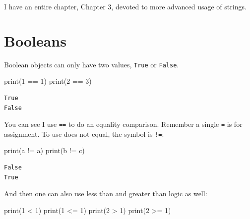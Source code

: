 \documentclass[
  letterpaper,
]{scrbook}
\newenvironment{Shaded}{\begin{snugshade}}{\end{snugshade}}
\newcommand{\BuiltInTok}[1]{\textcolor[rgb]{0.00,0.23,0.31}{#1}}
\newcommand{\DecValTok}[1]{\textcolor[rgb]{0.68,0.00,0.00}{#1}}
\newcommand{\NormalTok}[1]{\textcolor[rgb]{0.00,0.23,0.31}{#1}}
\newcommand{\OperatorTok}[1]{\textcolor[rgb]{0.37,0.37,0.37}{#1}}
\newcommand{\StringTok}[1]{\textcolor[rgb]{0.13,0.47,0.30}{#1}}
\begin{document}
I have an entire chapter, Chapter 3, devoted to more advanced usage of
strings.

\section{Booleans}\label{sec-bool}

Boolean objects can only have two values, \texttt{True} or
\texttt{False}.

\begin{Shaded}
\begin{Highlighting}[]
\BuiltInTok{print}\NormalTok{(}\DecValTok{1} \OperatorTok{==} \DecValTok{1}\NormalTok{)}
\BuiltInTok{print}\NormalTok{(}\DecValTok{2} \OperatorTok{==} \DecValTok{3}\NormalTok{)}
\end{Highlighting}
\end{Shaded}

\begin{verbatim}
True
False
\end{verbatim}

You can see I use \texttt{==} to do an equality comparison. Remember a
single \texttt{=} is for assignment. To use does not equal, the symbol
is \texttt{!=}:

\begin{Shaded}
\begin{Highlighting}[]
\BuiltInTok{print}\NormalTok{(}\StringTok{\textquotesingle{}a\textquotesingle{}} \OperatorTok{!=} \StringTok{\textquotesingle{}a\textquotesingle{}}\NormalTok{)}
\BuiltInTok{print}\NormalTok{(}\StringTok{\textquotesingle{}b\textquotesingle{}} \OperatorTok{!=} \StringTok{\textquotesingle{}c\textquotesingle{}}\NormalTok{)}
\end{Highlighting}
\end{Shaded}

\begin{verbatim}
False
True
\end{verbatim}

And then one can also use less than and greater than logic as well:

\begin{Shaded}
\begin{Highlighting}[]
\BuiltInTok{print}\NormalTok{(}\DecValTok{1} \OperatorTok{\textless{}} \DecValTok{1}\NormalTok{)}
\BuiltInTok{print}\NormalTok{(}\DecValTok{1} \OperatorTok{\textless{}=} \DecValTok{1}\NormalTok{)}
\BuiltInTok{print}\NormalTok{(}\DecValTok{2} \OperatorTok{\textgreater{}} \DecValTok{1}\NormalTok{)}
\BuiltInTok{print}\NormalTok{(}\DecValTok{2} \OperatorTok{\textgreater{}=} \DecValTok{1}\NormalTok{)}
\end{Highlighting}
\end{Shaded}
\end{document}

